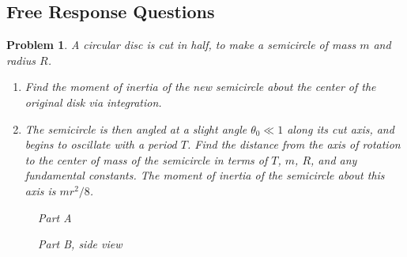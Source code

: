 \documentclass[12pt]{article}
\newcommand{\clearpts}{\addtocounter{tpts}{\value{cpts}} \setcounter{cpts}{0}}
\newcommand{\pts}[1]{\clearpts \setcounter{cpts}{#1}}
\theoremstyle{mystyle}
\newtheorem{pproblem}{Problem}
\begin{document}
\subsection*{Free Response Questions}
\setcounter{pproblem}{0}

\pts{10}
\begin{pproblem}
    A circular disc is cut in half, to make a semicircle of mass $m$ and radius $R$.
    \begin{enumerate}[\Alph*)]
        \item Find the moment of inertia of the new semicircle about
        the center of the original disk via integration.
        \item The semicircle is then angled at a slight angle $\theta_0\ll 1$ along its cut axis,
        and begins to oscillate with a period $T$. Find the distance from the axis of
        rotation to the center of mass of the semicircle in terms of $T$, $m$, $R$, and any fundamental constants. The moment of inertia
        of the semicircle about this axis is $mr^2/8$.
    \end{enumerate}
    \begin{minipage}{.5\textwidth}
        \begin{figure}[H]
            \centering
            \caption{Part A}
        \end{figure}
    \end{minipage}
    \begin{minipage}{.5\textwidth}
        \begin{figure}[H]
            \centering
            \caption{Part B, side view}
        \end{figure}
    \end{minipage}
\end{pproblem}
\end{document}
